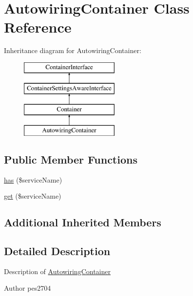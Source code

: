 \hypertarget{class_pes_1_1_container_1_1_autowiring_container}{}\section{Autowiring\+Container Class Reference}
\label{class_pes_1_1_container_1_1_autowiring_container}
Inheritance diagram for Autowiring\+Container\+:\begin{figure}[H]
\begin{center}
\leavevmode
\includegraphics[height=4.000000cm]{class_pes_1_1_container_1_1_autowiring_container}
\end{center}
\end{figure}
\subsection*{Public Member Functions}
\begin{DoxyCompactItemize}
\item 
\mbox{\hyperlink{class_pes_1_1_container_1_1_autowiring_container_a91d786bf5e60430567a9de84ebbcbfdd}{has}} (\$service\+Name)
\item 
\mbox{\hyperlink{class_pes_1_1_container_1_1_autowiring_container_a1a84a087ff94c2fb4af5e4b25d2b2d53}{get}} (\$service\+Name)
\end{DoxyCompactItemize}
\subsection*{Additional Inherited Members}


\subsection{Detailed Description}
Description of \mbox{\hyperlink{class_pes_1_1_container_1_1_autowiring_container}{Autowiring\+Container}}

\begin{DoxyAuthor}{Author}
pes2704 
\end{DoxyAuthor}


